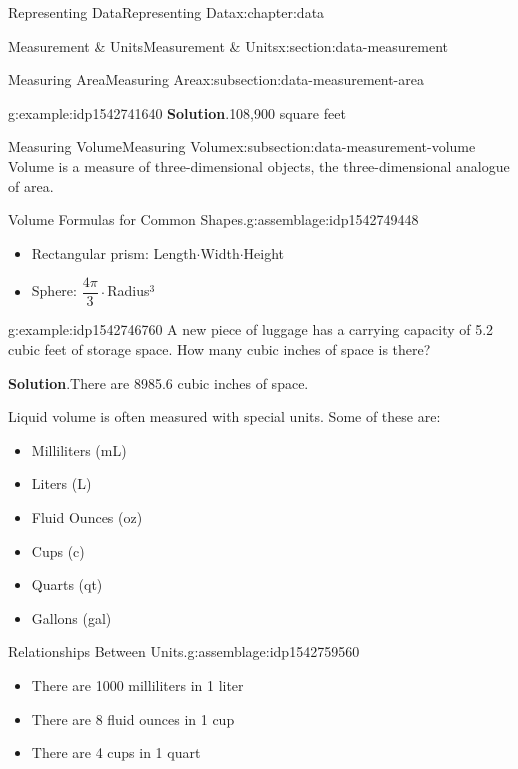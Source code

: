 \documentclass[oneside,10pt,]{book}
\newcommand{\blocktitlefont}{\relax}
\begin{document}
\begin{chapterptx}{Representing Data}{}{Representing Data}{}{}{x:chapter:data}
\begin{sectionptx}{Measurement \& Units}{}{Measurement \& Units}{}{}{x:section:data-measurement}
\begin{subsectionptx}{Measuring Area}{}{Measuring Area}{}{}{x:subsection:data-measurement-area}
\begin{example}{}{g:example:idp1542741640}
\noindent\textbf{\blocktitlefont Solution}.\hypertarget{g:solution:idp1542739592}{}\quad{}108,900 square feet%
\end{example}
\end{subsectionptx}
%
%
\typeout{************************************************}
\typeout{************************************************}
%
\begin{subsectionptx}{Measuring Volume}{}{Measuring Volume}{}{}{x:subsection:data-measurement-volume}
Volume is a measure of three-dimensional objects, the three-dimensional analogue of area.%
\begin{assemblage}{Volume Formulas for Common Shapes.}{g:assemblage:idp1542749448}%
%
\begin{itemize}[label=\textbullet]
\item{}Rectangular prism: Length\(\cdot\)Width\(\cdot\)Height%
\item{}Sphere: \(\dfrac{4\pi}{3}\cdot\)Radius\(^3\)%
\end{itemize}
%
\end{assemblage}
\begin{example}{}{g:example:idp1542746760}%
A new piece of luggage has a carrying capacity of 5.2 cubic feet of storage space.  How many cubic inches of space is there?%
\par\smallskip%
\noindent\textbf{\blocktitlefont Solution}.\hypertarget{g:solution:idp1542751112}{}\quad{}There are 8985.6 cubic inches of space.%
\end{example}
Liquid volume is often measured with special units.  Some of these are:%
\par
%
\begin{itemize}[label=\textbullet]
\item{}Milliliters (mL)%
\item{}Liters (L)%
\item{}Fluid Ounces (oz)%
\item{}Cups (c)%
\item{}Quarts (qt)%
\item{}Gallons (gal)%
\end{itemize}
%
\begin{assemblage}{Relationships Between Units.}{g:assemblage:idp1542759560}%
%
\begin{itemize}[label=\textbullet]
\item{}There are 1000 milliliters in 1 liter%
\item{}There are 8 fluid ounces in 1 cup%
\item{}There are 4 cups in 1 quart%

\end{itemize}
\end{assemblage}
\end{subsectionptx}
\end{sectionptx}
\end{chapterptx}
\end{document}
